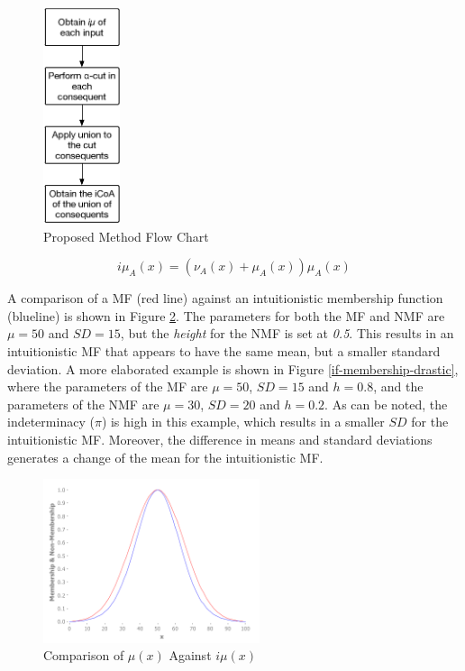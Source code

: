 \documentclass[conference]{IEEEtran}
\begin{document}
\begin{figure}[!t]
  \centering
  \includegraphics[height=2.5in]{proposed-method-flow-chart}
  \caption{Proposed Method Flow Chart}
  \label{flow-chart}
\end{figure}

\begin{equation}
  \label{imembership}
  i\mu_{A}(x) = (\nu_{A}(x) + \mu_{A}(x))\mu_{A}(x)
\end{equation}

A comparison of a MF (red line) against an intuitionistic
membership function (blueline) is shown in Figure
\ref{if-membership}. The parameters for both the MF and NMF are $\mu =
50$ and $SD = 15$, but the \textit{height} for the NMF is set at \textit{0.5}. This
results in an intuitionistic MF that appears to have the same mean,
but a smaller standard deviation. A more elaborated example is shown
in Figure \ref{if-membership-drastic}, where the parameters of the MF
are $\mu = 50$, $SD = 15$ and $h = 0.8$, and the parameters of the NMF
are $\mu = 30$, $SD = 20$ and $h = 0.2$. As can be noted, the
indeterminacy ($\pi$) is high in this example, which results in a
smaller $SD$ for the intuitionistic MF. Moreover, the difference in
means and standard deviations generates a change of the mean for the
intuitionistic MF.

\begin{figure}[!t]
  \centering
  \includegraphics[width=2.5in]{if-membership}
  \caption{Comparison of $\mu(x)$ Against $i\mu(x)$}
  \label{if-membership}
\end{figure}
\end{document}
